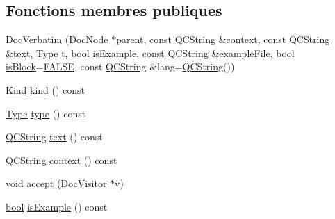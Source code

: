 \subsection*{Fonctions membres publiques}
\begin{DoxyCompactItemize}
\item 
\hyperlink{class_doc_verbatim_aa70e913a828657ceb4caf804417f2f7c}{Doc\+Verbatim} (\hyperlink{class_doc_node}{Doc\+Node} $\ast$\hyperlink{class_doc_node_a990d8b983962776a647e6231d38bd329}{parent}, const \hyperlink{class_q_c_string}{Q\+C\+String} \&\hyperlink{class_doc_verbatim_a4b087f9a80c4c1c2312149d019d6330f}{context}, const \hyperlink{class_q_c_string}{Q\+C\+String} \&\hyperlink{class_doc_verbatim_ac8c4801aa0a4243d489e8bbe0a28b708}{text}, \hyperlink{class_doc_verbatim_ad8c770dcf2e62369b95f4e34fb11fa36}{Type} \hyperlink{058__bracket__recursion_8tcl_a69e959f6901827e4d8271aeaa5fba0fc}{t}, \hyperlink{qglobal_8h_a1062901a7428fdd9c7f180f5e01ea056}{bool} \hyperlink{class_doc_verbatim_a2f874106da67d2c2031b4e43646038df}{is\+Example}, const \hyperlink{class_q_c_string}{Q\+C\+String} \&\hyperlink{class_doc_verbatim_af4952866820adc88aa826e94d06c9d03}{example\+File}, \hyperlink{qglobal_8h_a1062901a7428fdd9c7f180f5e01ea056}{bool} \hyperlink{class_doc_verbatim_a50bad443d6c85c88afcf8e435b10e062}{is\+Block}=\hyperlink{qglobal_8h_a10e004b6916e78ff4ea8379be80b80cc}{F\+A\+L\+S\+E}, const \hyperlink{class_q_c_string}{Q\+C\+String} \&lang=\hyperlink{class_q_c_string}{Q\+C\+String}())
\item 
\hyperlink{class_doc_node_aebd16e89ca590d84cbd40543ea5faadb}{Kind} \hyperlink{class_doc_verbatim_a480c731f4c8eefadd7d07d2e7e0ae119}{kind} () const 
\item 
\hyperlink{class_doc_verbatim_ad8c770dcf2e62369b95f4e34fb11fa36}{Type} \hyperlink{class_doc_verbatim_a9e507bc069090cbb92912a1f4472dbc8}{type} () const 
\item 
\hyperlink{class_q_c_string}{Q\+C\+String} \hyperlink{class_doc_verbatim_ac8c4801aa0a4243d489e8bbe0a28b708}{text} () const 
\item 
\hyperlink{class_q_c_string}{Q\+C\+String} \hyperlink{class_doc_verbatim_a4b087f9a80c4c1c2312149d019d6330f}{context} () const 
\item 
void \hyperlink{class_doc_verbatim_ae98dce2edd2ad0fa399930f8e61ee9b0}{accept} (\hyperlink{class_doc_visitor}{Doc\+Visitor} $\ast$v)
\item 
\hyperlink{qglobal_8h_a1062901a7428fdd9c7f180f5e01ea056}{bool} \hyperlink{class_doc_verbatim_a2f874106da67d2c2031b4e43646038df}{is\+Example} () const 

\end{DoxyCompactItemize}
